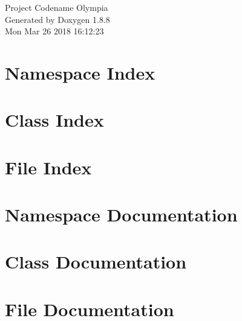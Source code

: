 \documentclass[twoside]{book}
\newcommand{\+}{\discretionary{\mbox{\scriptsize$\hookleftarrow$}}{}{}}
\newcommand{\clearemptydoublepage}{%
  \newpage{\pagestyle{empty}\cleardoublepage}%
}
\begin{document}
\hypersetup{pageanchor=false,
             bookmarks=true,
             bookmarksnumbered=true,
             pdfencoding=unicode
            }
\begin{titlepage}
\vspace*{7cm}
\begin{center}%
{\Large Project Codename Olympia }\\
\vspace*{1cm}
{\large Generated by Doxygen 1.8.8}\\
\vspace*{0.5cm}
{\small Mon Mar 26 2018 16:12:23}\\
\end{center}
\end{titlepage}
\clearemptydoublepage
\tableofcontents
\clearemptydoublepage
{}
\hypersetup{pageanchor=true}

\chapter{Namespace Index}

\chapter{Class Index}

\chapter{File Index}

\chapter{Namespace Documentation}

\chapter{Class Documentation}


















\chapter{File Documentation}



















\newpage
{}
{}
\printindex
\end{document}
